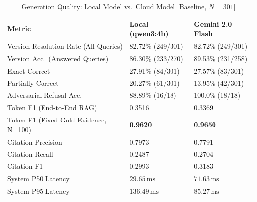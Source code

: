 \documentclass[journal]{IEEEtran}
\newcommand{\ms}{\,\mathrm{ms}}
\begin{document}
\begin{table}[!t]
\caption{Generation Quality: Local Model vs.\ Cloud Model [Baseline, $N=301$]}
\label{tab:generation}
\centering
\scriptsize
\setlength{\tabcolsep}{2.0pt}
\renewcommand{\arraystretch}{0.85}
\begin{tabularx}{\columnwidth}{ZYY}
\toprule
\textbf{Metric} & \textbf{Local (qwen3:4b)} & \textbf{Gemini 2.0 Flash}\\
\midrule
Version Resolution Rate (All Queries) & 82.72\% (249/301) & 82.72\% (249/301)\\
Version Acc.\ (Answered Queries) & 86.30\% (233/270) & 89.53\% (231/258)\\
Exact Correct & 27.91\% (84/301) & 27.57\% (83/301)\\
Partially Correct & 20.27\% (61/301) & 13.95\% (42/301)\\
Adversarial Refusal Acc. & 88.89\% (16/18) & 100.0\% (18/18)\\
Token F1 (End-to-End RAG) & 0.3516 & 0.3369\\
Token F1 (Fixed Gold Evidence, N=100) & \textbf{0.9620} & \textbf{0.9650}\\
Citation Precision & 0.7973 & 0.7791\\
Citation Recall & 0.2487 & 0.2704\\
Citation F1 & 0.2993 & 0.3183\\
System P50 Latency & $29.65\ms$ & $71.63\ms$\\
System P95 Latency & $136.49\ms$ & $85.27\ms$\\
\bottomrule
\end{tabularx}
\end{table}
\end{document}
